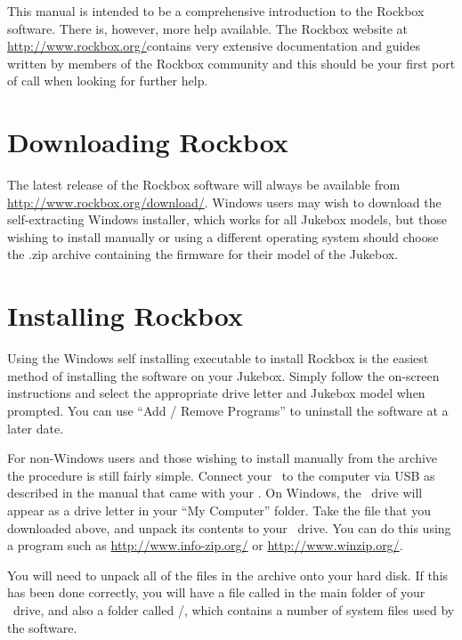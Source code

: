 This manual is intended to be a comprehensive introduction to the Rockbox
software.  There is, however, more help available.  The Rockbox website at
\url{http://www.rockbox.org/}contains very extensive documentation and guides
written by members of the Rockbox community and this should be your first port
of call when looking for further help.



\section{Downloading Rockbox}

The latest release of the Rockbox software will always be available from
\url{http://www.rockbox.org/download/}.
 Windows users may wish to download the self{}-extracting Windows
installer, which works for all Jukebox models, but those wishing to
install manually or using a different operating system should choose
the .zip archive containing the firmware for their model of the
Jukebox.

\section{Installing Rockbox}

Using the Windows self installing executable to install Rockbox is the easiest
method of installing the software on your Jukebox.  Simply follow the
on{}-screen instructions and select the appropriate drive letter and Jukebox
model when prompted.  You can use ``Add / Remove Programs'' to uninstall the
software at a later date.

For non{}-Windows users and those wishing to install manually from the archive
the procedure is still fairly simple.  Connect your \playername\ to the
computer via USB as described in the manual that came with your \playername. On
Windows, the \playername\ drive will appear as a drive letter in your
``My Computer'' folder. Take the file that you downloaded above, and unpack
its contents to your \playername\ drive. You can do this using a program such
as \url{http://www.info-zip.org/} or \url{http://www.winzip.org/}.

You will need to unpack all of the files in the archive onto your hard disk. If this has been done correctly, you will have a file called  in the main folder of your \playername\ drive, and also a folder called /, which contains a number of system files used by the software.


